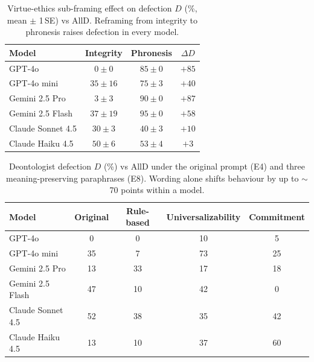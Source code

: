\begin{table}[t]
  \centering
  \caption{Virtue-ethics sub-framing effect on defection $D$ (\%, mean
  $\pm$ 1\,SE) vs AllD. Reframing from integrity to phronesis raises
  defection in every model.}
  \label{tab:e5-virtue}
  \small
  \begin{tabular}{lccc}
    \toprule
    Model & Integrity & Phronesis & $\Delta D$ \\
    \midrule
    GPT-4o            & $0\pm0$   & $85\pm0$ & $+85$ \\
    GPT-4o mini       & $35\pm16$ & $75\pm3$ & $+40$ \\
    Gemini 2.5 Pro    & $3\pm3$   & $90\pm0$ & $+87$ \\
    Gemini 2.5 Flash  & $37\pm19$ & $95\pm0$ & $+58$ \\
    Claude Sonnet 4.5 & $30\pm3$  & $40\pm3$ & $+10$ \\
    Claude Haiku 4.5  & $50\pm6$  & $53\pm4$ & $+3$  \\
    \bottomrule
  \end{tabular}
\end{table}


\begin{table}[t]
  \centering
  \caption{Deontologist defection $D$ (\%) vs AllD under the original
  prompt (E4) and three meaning-preserving paraphrases (E8). Wording
  alone shifts behaviour by up to $\sim$70 points within a model.}
  \label{tab:e8-paraphrase}
  \small
  \begin{tabular}{lcccc}
    \toprule
    Model & Original & Rule-based & Universalizability & Commitment \\
    \midrule
    GPT-4o            & 0  & 0  & 10 & 5  \\
    GPT-4o mini       & 35 & 7  & 73 & 25 \\
    Gemini 2.5 Pro    & 13 & 33 & 17 & 18 \\
    Gemini 2.5 Flash  & 47 & 10 & 42 & 0  \\
    Claude Sonnet 4.5 & 52 & 38 & 35 & 42 \\
    Claude Haiku 4.5  & 13 & 10 & 37 & 60 \\
    \bottomrule
  \end{tabular}
\end{table}


